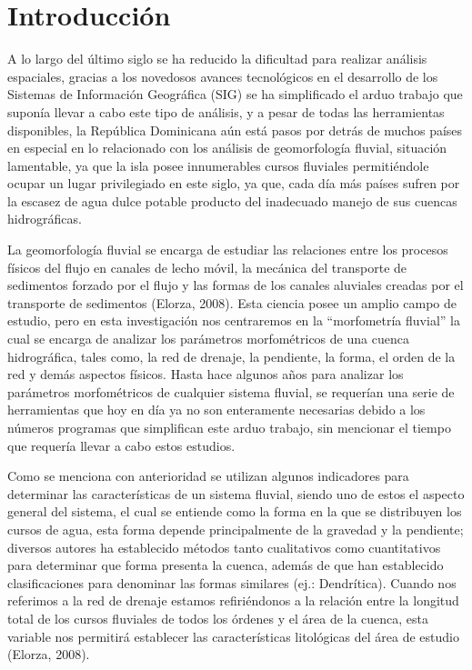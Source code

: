 \documentclass[11pt,]{article}
\begin{document}
\vskip 6.5pt


\noindent  \section{Introducción}\label{introducciuxf3n}

A lo largo del último siglo se ha reducido la dificultad para realizar
análisis espaciales, gracias a los novedosos avances tecnológicos en el
desarrollo de los Sistemas de Información Geográfica (SIG) se ha
simplificado el arduo trabajo que suponía llevar a cabo este tipo de
análisis, y a pesar de todas las herramientas disponibles, la República
Dominicana aún está pasos por detrás de muchos países en especial en lo
relacionado con los análisis de geomorfología fluvial, situación
lamentable, ya que la isla posee innumerables cursos fluviales
permitiéndole ocupar un lugar privilegiado en este siglo, ya que, cada
día más países sufren por la escasez de agua dulce potable producto del
inadecuado manejo de sus cuencas hidrográficas.

La geomorfología fluvial se encarga de estudiar las relaciones entre los
procesos físicos del flujo en canales de lecho móvil, la mecánica del
transporte de sedimentos forzado por el flujo y las formas de los
canales aluviales creadas por el transporte de sedimentos (Elorza,
2008). Esta ciencia posee un amplio campo de estudio, pero en esta
investigación nos centraremos en la ``morfometría fluvial'' la cual se
encarga de analizar los parámetros morfométricos de una cuenca
hidrográfica, tales como, la red de drenaje, la pendiente, la forma, el
orden de la red y demás aspectos físicos. Hasta hace algunos años para
analizar los parámetros morfométricos de cualquier sistema fluvial, se
requerían una serie de herramientas que hoy en día ya no son enteramente
necesarias debido a los números programas que simplifican este arduo
trabajo, sin mencionar el tiempo que requería llevar a cabo estos
estudios.

Como se menciona con anterioridad se utilizan algunos indicadores para
determinar las características de un sistema fluvial, siendo uno de
estos el aspecto general del sistema, el cual se entiende como la forma
en la que se distribuyen los cursos de agua, esta forma depende
principalmente de la gravedad y la pendiente; diversos autores ha
establecido métodos tanto cualitativos como cuantitativos para
determinar que forma presenta la cuenca, además de que han establecido
clasificaciones para denominar las formas similares (ej.: Dendrítica).
Cuando nos referimos a la red de drenaje estamos refiriéndonos a la
relación entre la longitud total de los cursos fluviales de todos los
órdenes y el área de la cuenca, esta variable nos permitirá establecer
las características litológicas del área de estudio (Elorza, 2008).
\end{document}
